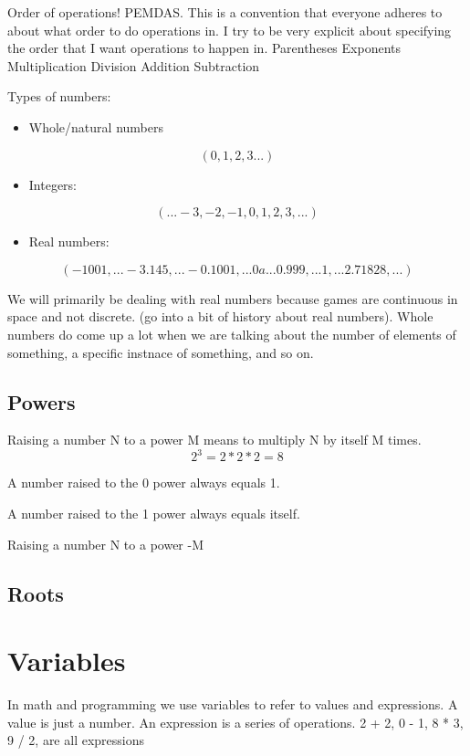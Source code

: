 \documentclass[11pt]{article}
\begin{document}
Order of operations! PEMDAS. This is a convention that everyone adheres to about what order to do operations in. 
I try to be very explicit about specifying the order that I want operations to happen in. 
Parentheses
Exponents
Multiplication
Division
Addition
Subtraction

Types of numbers:
\begin{itemize}
\item Whole/natural numbers
\end{itemize}
\begin{equation}
(0, 1, 2, 3 ...)
\end{equation}
\begin{itemize}
\item Integers:
\end{itemize}
\begin{equation}
(... -3, -2, -1, 0, 1, 2, 3, ...)
\end{equation}
\begin{itemize}
\item Real numbers:
\end{itemize}
\begin{equation}
(-1001, ... -3.145, ... -0.1001, ... 0a ... 0.999, ... 1, ... 2.71828, ...)
\end{equation}


We will primarily be dealing with real numbers because games are continuous in space and not discrete. (go into a bit of history about real numbers). 
Whole numbers do come up a lot when we are talking about the number of elements of something, a specific instnace of something, and so on. 

\subsection{Powers}
\label{sec-3-1}
Raising a number N to a power M means to multiply N by itself M times.
\begin{equation}
2^{3} = 2 * 2 * 2 = 8
\end{equation}  

A number raised to the 0 power always equals 1. 

A number raised to the 1 power always equals itself.

Raising a number N to a power -M 
\subsection{Roots}
\label{sec-3-2}
\section{Variables}
\label{sec-4}
In math and programming we use variables to refer to values and expressions. 
A value is just a number. 
An expression is a series of operations. 2 + 2, 0 - 1, 8 * 3, 9 / 2, are all expressions
\end{document}
